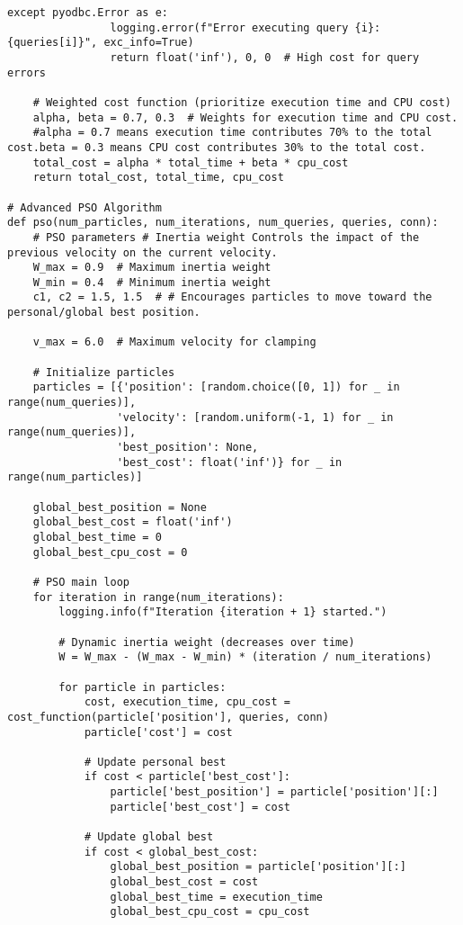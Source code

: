 \begin{lstlisting}[style=pythonstyle, caption={Python script to automate optimal view.}, label={lst:fullCode}]
            except pyodbc.Error as e:
                logging.error(f"Error executing query {i}: {queries[i]}", exc_info=True)
                return float('inf'), 0, 0  # High cost for query errors

    # Weighted cost function (prioritize execution time and CPU cost)
    alpha, beta = 0.7, 0.3  # Weights for execution time and CPU cost.
    #alpha = 0.7 means execution time contributes 70% to the total cost.beta = 0.3 means CPU cost contributes 30% to the total cost.
    total_cost = alpha * total_time + beta * cpu_cost
    return total_cost, total_time, cpu_cost

# Advanced PSO Algorithm
def pso(num_particles, num_iterations, num_queries, queries, conn):
    # PSO parameters # Inertia weight Controls the impact of the previous velocity on the current velocity.
    W_max = 0.9  # Maximum inertia weight 
    W_min = 0.4  # Minimum inertia weight
    c1, c2 = 1.5, 1.5  # # Encourages particles to move toward the personal/global best position.

    v_max = 6.0  # Maximum velocity for clamping

    # Initialize particles
    particles = [{'position': [random.choice([0, 1]) for _ in range(num_queries)],
                 'velocity': [random.uniform(-1, 1) for _ in range(num_queries)],
                 'best_position': None,
                 'best_cost': float('inf')} for _ in range(num_particles)]

    global_best_position = None
    global_best_cost = float('inf')
    global_best_time = 0
    global_best_cpu_cost = 0

    # PSO main loop
    for iteration in range(num_iterations):
        logging.info(f"Iteration {iteration + 1} started.")
        
        # Dynamic inertia weight (decreases over time)
        W = W_max - (W_max - W_min) * (iteration / num_iterations)

        for particle in particles:
            cost, execution_time, cpu_cost = cost_function(particle['position'], queries, conn)
            particle['cost'] = cost

            # Update personal best
            if cost < particle['best_cost']:
                particle['best_position'] = particle['position'][:]
                particle['best_cost'] = cost

            # Update global best
            if cost < global_best_cost:
                global_best_position = particle['position'][:]
                global_best_cost = cost
                global_best_time = execution_time
                global_best_cpu_cost = cpu_cost


\end{lstlisting}
